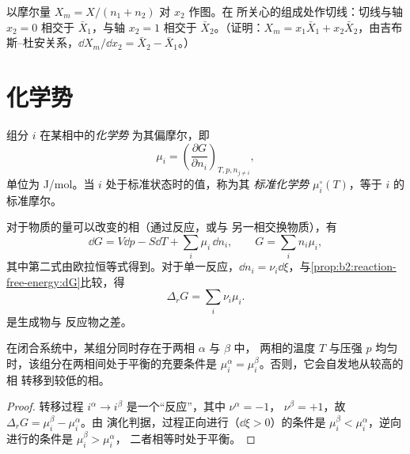 \begin{method}[由曲线求偏摩尔量]\label{met:b2:chemical-potential:tangent}
以摩尔量 $X_m = X/(n_1 + n_2)$ 对 $x_2$ 作图。在
所关心的组成处作切线：切线与轴 $x_2 = 0$ 相交于
$\bar X_1$，与轴 $x_2 = 1$ 相交于 $\bar X_2$。（证明：$X_m = x_1\bar X_1 +
x_2\bar X_2$，由吉布斯–杜安关系，$\dd X_m/\dd x_2 = \bar X_2 - \bar X_1$。）
\end{method}

\section{化学势}

\begin{definition}[化学势]\label{def:b2:chemical-potential:chemical-potential}
组分 $i$ 在某相中的\emph{化学势}
为其偏摩尔，即
\[
  \mu_i = \left(\frac{\partial G}{\partial n_i}\right)_{T, p, n_{j\ne i}} ,
\]
单位为 \unit{J/mol}。当 $i$ 处于标准状态时的值，称为其
\emph{标准化学势}
$\mu_i^\circ(T)$，等于 $i$ 的标准摩尔。
\end{definition}

对于物质的量可以改变的相（通过反应，或与
另一相交换物质），有
\[
  \dd G = V\dd p - S\dd T + \sum_i\mu_i\,\dd n_i ,\qquad G = \sum_i n_i\mu_i ,
\]
其中第二式由欧拉恒等式得到。对于单一反应，$\dd n_i =
\nu_i\dd\xi$，与\cref{prop:b2:reaction-free-energy:dG}比较，得
\[
  \Delta_r G = \sum_i\nu_i\mu_i .
\]
是生成物与
反应物之差。

\begin{theorem}[相间平衡]\label{thm:b2:chemical-potential:phase-equilibrium}
在闭合系统中，某组分同时存在于两相 $\alpha$ 与 $\beta$ 中，
两相的温度 $T$ 与压强 $p$ 均匀时，该组分在两相间处于平衡的充要条件是
$\mu_i^\alpha = \mu_i^\beta$。否则，它会自发地从较高的相
转移到较低的相。
\end{theorem}

\begin{proof}
转移过程 $i^\alpha \to i^\beta$ 是一个“反应”，其中 $\nu^\alpha = -1$，
$\nu^\beta = +1$，故 $\Delta_r G = \mu_i^\beta - \mu_i^\alpha$。由
演化判据，过程正向进行（$\dd\xi > 0$）的条件是 $\mu_i^\beta <
\mu_i^\alpha$，逆向进行的条件是 $\mu_i^\beta > \mu_i^\alpha$，
二者相等时处于平衡。
\end{proof}

